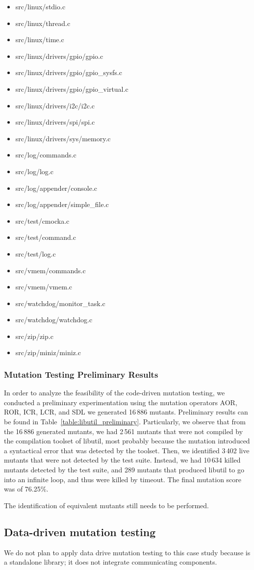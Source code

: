 \begin{itemize}
	\item src/linux/stdio.c
	\item src/linux/thread.c
	\item src/linux/time.c
	\item src/linux/drivers/gpio/gpio.c
	\item src/linux/drivers/gpio/gpio\_sysfs.c
	\item src/linux/drivers/gpio/gpio\_virtual.c
	\item src/linux/drivers/i2c/i2c.c
	\item src/linux/drivers/spi/spi.c
	\item src/linux/drivers/sys/memory.c
	\item src/log/commands.c
	\item src/log/log.c
	\item src/log/appender/console.c
	\item src/log/appender/simple\_file.c
	\item src/test/cmocka.c
	\item src/test/command.c
	\item src/test/log.c
	\item src/vmem/commands.c
	\item src/vmem/vmem.c
	\item src/watchdog/monitor\_task.c
	\item src/watchdog/watchdog.c
	\item src/zip/zip.c
	\item src/zip/miniz/miniz.c
\end{itemize}

\subsubsection{Mutation Testing Preliminary Results}



In order to analyze the feasibility of the code-driven mutation testing, we conducted a preliminary experimentation using the mutation operators AOR, ROR, ICR, LCR, and SDL we generated 16\,886 mutants. Preliminary results can be found in Table~\ref{table:libutil_preliminary}.
Particularly, we observe that from the 16\,886 generated mutants, we had 2\,561 mutants that were not compiled by the compilation toolset of libutil, most probably because the mutation introduced a syntactical error that was detected by the toolset.
Then, we identified 3\,402 live mutants that were not detected by the test suite. Instead, we had 10\,634 killed mutants detected by the test suite, and 289 mutants that produced libutil to go into an infinite loop, and thus were killed by timeout. The final mutation score was of 76.25\%.

The identification of equivalent mutants still needs to be performed.


\subsection{Data-driven mutation testing}

We do not plan to apply data drive mutation testing to this case study because is a standalone library; it does not integrate communicating components.
